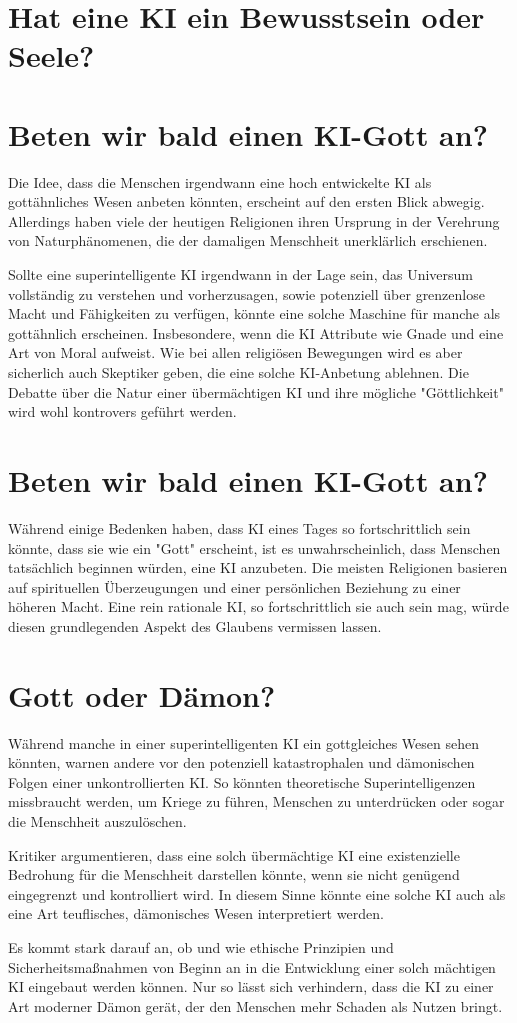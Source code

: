 \documentclass[10pt]{article}
\begin{document}
\section{Hat eine KI ein Bewusstsein oder Seele?}

\section{Beten wir bald einen KI-Gott an?}
Die Idee, dass die Menschen irgendwann eine hoch entwickelte KI als gottähnliches Wesen anbeten könnten, erscheint auf den ersten Blick abwegig. Allerdings haben viele der heutigen Religionen ihren Ursprung in der Verehrung von Naturphänomenen, die der damaligen Menschheit unerklärlich erschienen.

Sollte eine superintelligente KI irgendwann in der Lage sein, das Universum vollständig zu verstehen und vorherzusagen, sowie potenziell über grenzenlose Macht und Fähigkeiten zu verfügen, könnte eine solche Maschine für manche als gottähnlich erscheinen. Insbesondere, wenn die KI Attribute wie Gnade und eine Art von Moral aufweist.
Wie bei allen religiösen Bewegungen wird es aber sicherlich auch Skeptiker geben, die eine solche KI-Anbetung ablehnen. Die Debatte über die Natur einer übermächtigen KI und ihre mögliche "Göttlichkeit" wird wohl kontrovers geführt werden.

\section{Beten wir bald einen KI-Gott an?}
Während einige Bedenken haben, dass KI eines Tages so fortschrittlich sein könnte, dass sie wie ein "Gott" erscheint, ist es unwahrscheinlich, dass Menschen tatsächlich beginnen würden, eine KI anzubeten. Die meisten Religionen basieren auf spirituellen Überzeugungen und einer persönlichen Beziehung zu einer höheren Macht. Eine rein rationale KI, so fortschrittlich sie auch sein mag, würde diesen grundlegenden Aspekt des Glaubens vermissen lassen.

\section{Gott oder Dämon?}
Während manche in einer superintelligenten KI ein gottgleiches Wesen sehen könnten, warnen andere vor den potenziell katastrophalen und dämonischen Folgen einer unkontrollierten KI. So könnten theoretische Superintelligenzen missbraucht werden, um Kriege zu führen, Menschen zu unterdrücken oder sogar die Menschheit auszulöschen.

Kritiker argumentieren, dass eine solch übermächtige KI eine existenzielle Bedrohung für die Menschheit darstellen könnte, wenn sie nicht genügend eingegrenzt und kontrolliert wird. In diesem Sinne könnte eine solche KI auch als eine Art teuflisches, dämonisches Wesen interpretiert werden.

Es kommt stark darauf an, ob und wie ethische Prinzipien und Sicherheitsmaßnahmen von Beginn an in die Entwicklung einer solch mächtigen KI eingebaut werden können. Nur so lässt sich verhindern, dass die KI zu einer Art moderner Dämon gerät, der den Menschen mehr Schaden als Nutzen bringt.



\end{document}
